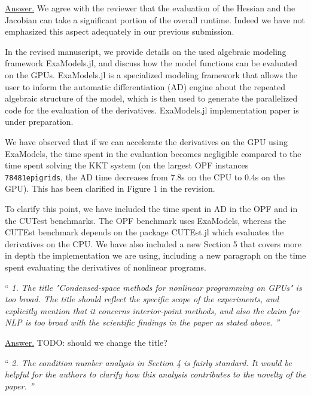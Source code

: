 \documentclass[10pt,a4paper]{article}
\newenvironment{quotereviewer}{\vspace{.5cm}{\underline\reviewername} ``\it\footnotesize}{''}
\newcommand{\answer}{\vspace{1mm}\underline{Answer.} }
\begin{document}
\answer
We agree with the reviewer that the evaluation of the Hessian and the Jacobian
can take a significant portion of the overall runtime.
Indeed we have not emphasized this aspect adequately in our previous submission.

In the revised manuscript, we provide details on the used algebraic modeling framework ExaModels.jl, and
discuss how the model functions can be evaluated on the GPUs.
ExaModels.jl is a specialized modeling framework that allows the user to inform the automatic differentiation (AD) engine
about the repeated algebraic structure of the model, which is then used to generate the parallelized code for the evaluation of the derivatives.
ExaModels.jl implementation paper is under preparation.

We have observed that if we can accelerate the derivatives on the GPU using ExaModels, the time spent in
the evaluation becomes negligible compared to the time spent solving the KKT
system (on the largest OPF instances {\tt 78481epigrids}, the AD time
decreases from 7.8s on the CPU to 0.4s on the GPU).
This has been clarified in Figure 1 in the revision.

To clarify this point, we have included the time spent in AD in the OPF
and in the CUTest benchmarks. The OPF benchmark uses ExaModels, whereas
the CUTEst benchmark depends on the package CUTEst.jl which evaluates the
derivatives on the CPU. We have also included a new Section 5 that covers more
in depth the implementation we are using, including a new paragraph on the time
spent evaluating the derivatives of nonlinear programs.



\begin{quotereviewer}
1. The title "Condensed-space methods for nonlinear programming on GPUs" is too broad.
The title should reﬂect the speciﬁc scope of the experiments, and explicitly mention that it
concerns interior-point methods, and also the claim for NLP is too broad with the scientiﬁc
ﬁndings in the paper as stated above.
\end{quotereviewer}

\answer
TODO: should we change the title?


\begin{quotereviewer}
2. The condition number analysis in Section 4 is fairly standard. It would be helpful for the
authors to clarify how this analysis contributes to the novelty of the paper.
\end{quotereviewer}
\end{document}
